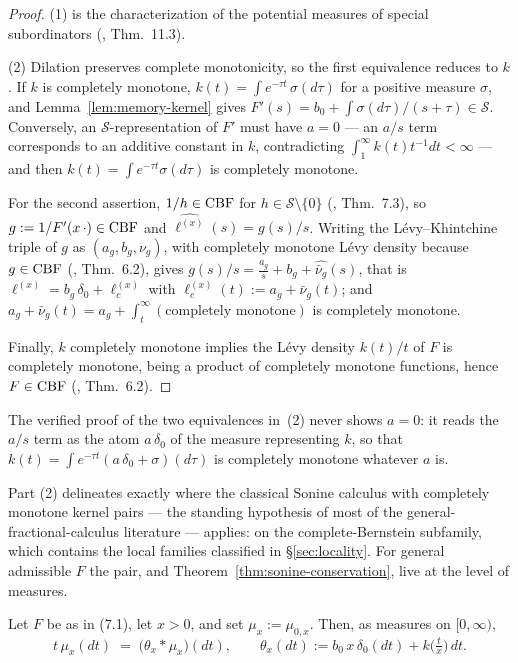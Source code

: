\begin{proof}
(1) is the characterization of the potential measures of special subordinators
(, Thm.~11.3).

(2) Dilation preserves complete monotonicity, so the first equivalence reduces to $k$. If $k$
is completely monotone, $k(t) = \int e^{-\tau t}\,\sigma(d\tau)$ for a positive measure
$\sigma$, and Lemma~\ref{lem:memory-kernel} gives
$F'(s) = b_0 + \int \sigma(d\tau)/(s+\tau) \in \mathcal{S}$. Conversely, an
$\mathcal{S}$-representation of $F'$ must have $a = 0$ --- an $a/s$ term corresponds to an
additive constant in $k$, contradicting $\int_1^\infty k(t)t^{-1}dt < \infty$ --- and then
$k(t) = \int e^{-\tau t}\sigma(d\tau)$ is completely monotone.

For the second assertion, $1/h \in \mathrm{CBF}$ for $h \in \mathcal{S}\setminus\{0\}$
(, Thm.~7.3), so $g := 1/F'(x\,\cdot) \in \mathrm{CBF}$ and
$\widehat{\ell^{(x)}}(s) = g(s)/s$. Writing the Lévy--Khintchine triple of $g$ as
$(a_g, b_g, \nu_g)$, with completely monotone Lévy density because $g \in \mathrm{CBF}$
(, Thm.~6.2), gives
$g(s)/s = \tfrac{a_g}{s} + b_g + \widehat{\bar\nu_g}(s)$, that is
$\ell^{(x)} = b_g\,\delta_0 + \ell_c^{(x)}$ with $\ell_c^{(x)}(t) := a_g + \bar\nu_g(t)$; and
$a_g + \bar\nu_g(t) = a_g + \int_t^\infty(\text{completely monotone})$ is completely
monotone.

Finally, $k$ completely monotone implies the Lévy density $k(t)/t$ of $F$ is completely
monotone, being a product of completely monotone functions, hence $F \in \mathrm{CBF}$
(, Thm.~6.2).
\end{proof}

The verified proof of the two equivalences in~(2) never shows $a = 0$: it reads the $a/s$
term as the atom $a\,\delta_0$ of the measure representing $k$, so that
$k(t) = \int e^{-\tau t}(a\,\delta_0 + \sigma)(d\tau)$ is completely monotone whatever $a$ is.

Part (2) delineates exactly where the classical Sonine calculus with completely monotone
kernel pairs --- the standing hypothesis of most of the general-fractional-calculus
literature --- applies: on the complete-Bernstein subfamily, which contains the local
families classified in \S\ref{sec:locality}. For general admissible
$F$ the pair, and Theorem~\ref{thm:sonine-conservation}, live at the level of measures.

\begin{proposition}\label{prop:volterra}
Let $F$ be as in (7.1), let $x > 0$, and set $\mu_x := \mu_{0,x}$. Then, as measures on
$[0,\infty)$,
\[
  t\,\mu_x(dt) \;=\; \bigl(\theta_x * \mu_x\bigr)(dt),
  \qquad \theta_x(dt) := b_0\,x\,\delta_0(dt) + k\bigl(\tfrac{t}{x}\bigr)\,dt. \tag{V.1}
\]
\end{proposition}

